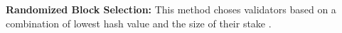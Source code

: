 \textbf{Randomized Block Selection:}
This method choses validators based on a combination of lowest hash value and the size of their stake \cite{misc:001}.

